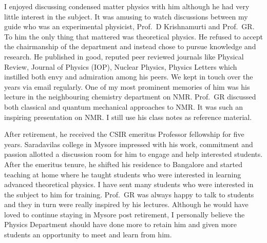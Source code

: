 I enjoyed discussing condensed matter physics with him although he had very little interest in the subject. It was
amusing to watch discussions between my guide who was an experimental physicist, Prof.\ D Krishnamurti and
Prof.\ GR. To him the only thing that mattered was theoretical physics. He refused to accept the chairmanship
of the department and instead chose to pursue knowledge and research. He published in good, reputed peer
reviewed journals like Physical Review, Journal of Physics (IOP), Nuclear Physics, Physics Letters which instilled
both envy and admiration among his peers. We kept in touch over the years via email regularly. One of my most prominent memories of him was his lecture in the neighbouring chemistry department on NMR. Prof.\ GR discussed 
both classical and quantum mechanical approaches to NMR. It was such an inspiring presentation on NMR. I still
use his class notes as reference material.

After retirement, he received the CSIR emeritus Professor fellowship for five years. Saradavilas college in
Mysore impressed with his work, commitment and passion allotted a discussion room for him to engage and
help interested students. After the emeritus tenure, he shifted his residence to Bangalore and started teaching at
home where he taught students who were interested in learning advanced theoretical physics. I have sent many
students who were interested in the subject to him for training. Prof.\ GR was always happy to talk to students and
they in turn were really inspired by his lectures. Although he would have loved to continue staying in Mysore post
retirement, I personally believe the Physics Department should have done more to retain him and given more
students an opportunity to meet and learn from him.
\newpage

